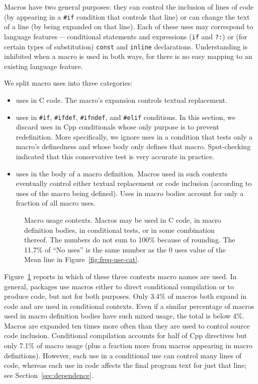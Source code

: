 \documentclass[10pt]{article}
\newcommand{\captionsmall}[1]{\caption[]{\small #1}}
\begin{document}
Macros have two general purposes: they can control the inclusion of lines
of code (by appearing in a \texttt{\#if} condition that controls that line)
or can change the text of a line (by being expanded on that line).  Each of
these uses may correspond to language features\,---\,conditional statements
and expressions (\texttt{if} and {\tt ?:}) or (for certain types of
substitution) {\tt const} and {\tt inline} declarations.  Understanding is
inhibited when a macro is used in both ways, for there is no easy mapping
to an existing language feature.


We split macro uses into three categories:
\begin{itemize}\itemsep 0pt \parskip 0pt
\item uses in C code.   The macro's expansion controls textual
      replacement.
\item uses in \texttt{\#if}, \texttt{\#ifdef}, \texttt{\#ifndef}, and
  \texttt{\#elif} conditions.  In this section, we discard uses in Cpp
  conditionals whose only purpose is to prevent redefinition.  More
  specifically, we ignore uses in a condition that tests only a macro's
  definedness and whose body only defines that macro.  Spot-checking
  indicated that this conservative test is very accurate in practice.
\item uses in the body of a macro definition.
  Macros used in such contexts eventually control either textual
  replacement or code inclusion (according to uses of the macro being
  defined).  Uses in macro bodies account for only a fraction of all macro
  uses.
\end{itemize}

\begin{figure}
\centerline{\small
  \setlength{\tabcolsep}{.25em}
}
\captionsmall{Macro usage contexts.  Macros may be used in C code, in
  macro definition bodies, in conditional tests, or in some combination
  thereof.  The numbers do not sum to 100\% because of rounding.  The 11.7\%
  of ``No uses'' is the same number as the 0 uses value of the Mean line in
  Figure~\ref{fig:freq-use-cat}.}
\label{fig:where-used}
\end{figure}

Figure~\ref{fig:where-used} reports in which of these three contexts macro
names are used.  In general, packages use macros either to direct
conditional compilation or to produce code, but not for both purposes.
Only 3.4\% of macros both expand in code and are used in conditional
contexts.  Even if a similar percentage of macros used in macro definition
bodies have such mixed usage, the total is below 4\%.  Macros are expanded
ten times more often than they are used to control source code inclusion.
Conditional compilation accounts for half of Cpp directives but only 7.1\%
of macro usage (plus a fraction more from macros appearing in macro
definitions).  However, each use in a conditional use can control many
lines of code, whereas each use in code affects the final program text for
just that line; see Section~\ref{sec:dependence}.
\end{document}

